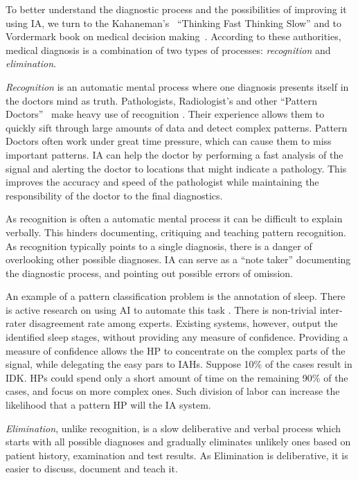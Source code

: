 \documentclass[11pt]{pnas-new}
\begin{document}
To better understand the diagnostic process and the possibilities  of
improving it using IA, we turn to the Kahaneman's~\cite{kahneman2011thinking}
``Thinking Fast Thinking Slow'' and to Vordermark book on medical
decision making~\cite{vordermark2019introduction}. According to these authorities,
medical diagnosis is a combination of two types of processes: {\em
  recognition} and {\em elimination}.

{\em Recognition} is an automatic mental process where one diagnosis
presents itself in the doctors mind as truth. Pathologists,
Radiologist's and other ``Pattern Doctors''~\cite{topol2019deep} make heavy use
of recognition . Their experience allows them to quickly sift through
large amounts of data and detect complex patterns. Pattern Doctors 
often work under great time pressure, which can cause them to miss
important patterns. IA can help the doctor by performing a fast
analysis of the signal and alerting the doctor to locations that might
indicate a pathology. This improves the accuracy and speed of the
pathologist while maintaining the responsibility of the doctor to the
final diagnostics. 

As recognition is often a automatic mental process it can be difficult to explain verbally.
This hinders documenting, critiquing and teaching pattern recognition. As
recognition typically points to a single diagnosis, there is a danger
of overlooking other possible diagnoses. IA can serve as a ``note
taker'' documenting the diagnostic process, and pointing out possible
errors of omission. 

An example of a pattern classification problem is the annotation of
sleep. There is active research on using AI to automate this task
\cite{sleepHT2020}.
There is non-trivial inter-rater disagreement rate among experts.  
Existing systems, however, output the identified sleep stages, 
without providing any measure of confidence. Providing a measure of confidence allows the HP to concentrate on the complex parts of the signal, while delegating the easy pars to IAHs. 
Suppose 10\% of the cases result in IDK. HPs could spend only a short amount of time on the remaining 90\% of the cases, and focus on more complex ones.
Such division of labor can increase the likelihood that a pattern HP will  the IA system.

{\em Elimination}, unlike recognition, is a slow deliberative and
verbal process which starts with all possible diagnoses and gradually
eliminates unlikely ones based on patient history, examination and
test results. As Elimination is deliberative, it is easier to discuss,
document and teach it.
\end{document}
